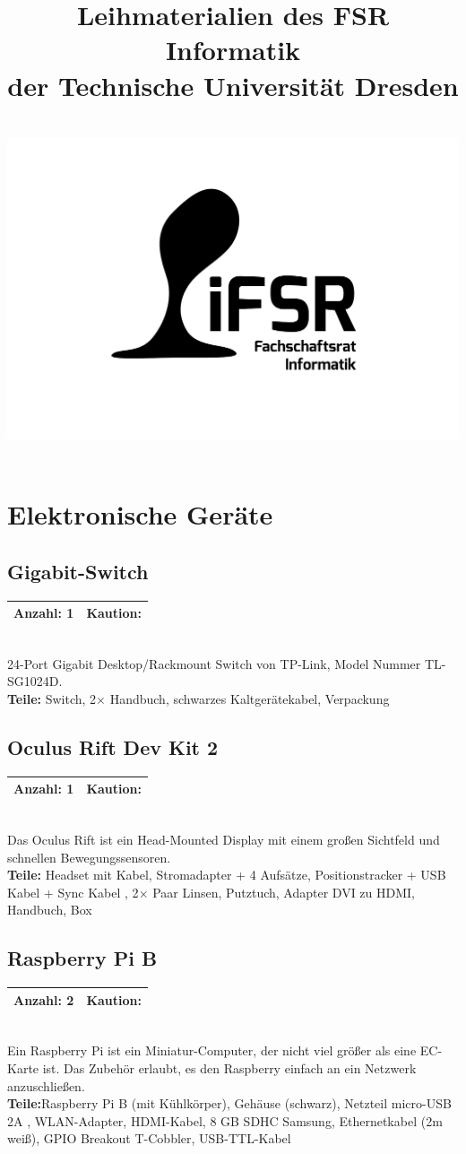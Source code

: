 \documentclass[a4paper]{article}
\newcommand{\iFSR}{FSR Informatik}
\newcommand{\infobox}[3] %
        {\par
                \begin{tabular}{| c | c | }
                \hline
                Anzahl: #1 & Kaution: \EUR{#3}   \\
                \hline
                \end{tabular} \\
        }
\begin{document}
\title{\bf Leihmaterialien des \iFSR \\
        der Technische Universität Dresden \\~\\
         \includegraphics[width=.3\textwidth]{fsrlogo}
}

\maketitle


\tableofcontents


\pagebreak

\section{Elektronische Geräte}

\subsection{Gigabit-Switch}
\infobox{1}{1}{0}
24-Port Gigabit Desktop/Rackmount Switch von TP-Link, Model Nummer TL-SG1024D. \\
\textbf{ Teile:} Switch, 2$\times$ Handbuch, schwarzes Kaltgerätekabel, Verpackung

\subsection{Oculus Rift Dev Kit 2}
\infobox{1}{30}{20}
Das Oculus Rift ist ein Head-Mounted Display mit einem großen Sichtfeld und schnellen Bewegungssensoren. \\
\textbf{Teile:} Headset mit Kabel, Stromadapter + 4 Aufsätze, Positionstracker + USB Kabel + Sync Kabel , 2$\times$ Paar Linsen, Putztuch, Adapter DVI zu HDMI, Handbuch, Box

\subsection{Raspberry Pi B}
\infobox{2}{1}{0}
Ein Raspberry Pi ist ein Miniatur-Computer, der nicht viel größer als eine EC-Karte ist. Das Zubehör erlaubt, es den Raspberry einfach an ein Netzwerk anzuschließen. \\
\textbf{Teile:}Raspberry Pi B (mit Kühlkörper), Gehäuse (schwarz), Netzteil micro-USB 2A , WLAN-Adapter, HDMI-Kabel, 8 GB SDHC Samsung, Ethernetkabel (2m weiß), GPIO Breakout T-Cobbler, USB-TTL-Kabel 
\end{document}
